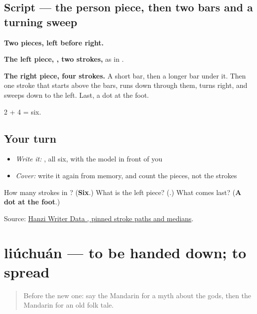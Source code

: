 \subsection*{Script — the person piece, then two bars and a turning sweep}

\begin{quote}
\end{quote}

\textbf{Two pieces, left before right.}

\textbf{The left piece, , two strokes,} as in .

\textbf{The right piece, four strokes.} A short bar, then a longer bar under it. Then one stroke that starts above the bars, runs down through them, turns right, and sweeps down to the left. Last, a dot at the foot.

2 + 4 = six.

\subsection*{Your turn}
\begin{itemize}
\raggedright
  \item \emph{Write it:} , all six, with the model in front of you
  \item \emph{Cover:} write it again from memory, and count the pieces, not the strokes
\end{itemize}

\begin{tcolorbox}[breakable,colback=teal!4,colframe=teal!35!black,title={Before you move on}]
How many strokes in ? (\textbf{Six}.) What is the left piece? (\textbf{}.) What comes last? (\textbf{A dot at the foot}.)

Source: \href{https://raw.githubusercontent.com/chanind/hanzi-writer-data/68d10a4b21150cae5e1ebbd223eed289cf32d90c/data/\%E4\%BC\%A0.json}{Hanzi Writer Data , pinned stroke paths and medians}.
\end{tcolorbox}
\section[liúchuán]{liúchuán — to be handed down; to spread}

\label{lesson:ZH-C328-liuchuan}



\begin{quote}
Before the new one: say the Mandarin for a myth about the gods, then the Mandarin for an old folk tale.
\end{quote}

